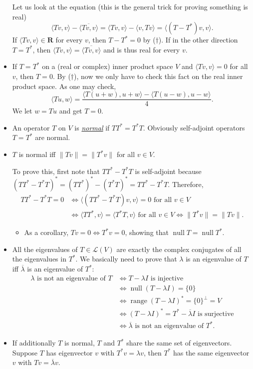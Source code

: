 \documentclass{article}
\newcommand{\df}[1]{\ul{\textit{#1}}}
\newcommand{\R}{\mathbf{R}}
\newcommand{\n}{\operatorname{null}}
\renewcommand{\r}{\operatorname{range}}
\newcommand{\conj}[1]{\overline{#1}}
\newcommand{\inp}[2]{\langle #1, #2 \rangle}
\newcommand{\nm}[1]{\| #1 \|}
\newcommand{\LV}{\mathcal{L}(V)}
\begin{document}
\begin{itemize}
    Let us look at the equation (this is the general trick for proving something is real)
    $$\inp{Tv}{v}-\conj{\inp{Tv}{v}}=\inp{Tv}{v}-\inp{v}{Tv}=\inp{(T-T^*)v}{v}.$$ If $\inp{Tv}{v} \in \R$ for every $v$, then $T-T^*=0$ by ($\dagger$). If in the other direction $T=T^*$, then $\inp{Tv}{v}=\conj{\inp{Tv}{v}}$ and is thus real for every $v$.
    \item If $T = T^*$ on a (real or complex) inner product space $V$ and $\inp{Tv}{v}=0$ for all $v$, then $T = 0$. By ($\dagger$), now we only have to check this fact on the real inner product space. As one may check, $$\inp{Tu}{w} = \frac{\inp{T(u+w)}{u+w}-\inp{T(u-w)}{u-w}}{4}.$$ We let $w = Tu$ and get $T = 0$.
    \item An operator $T$ on $V$ is \df{normal} if $TT^* = T^*T$. Obviously self-adjoint operators $T = T^*$ are normal.
    \item $T$ is normal iff $\nm{Tv}=\nm{T^*v}$ for all $v \in V$.
    
    To prove this, first note that $TT^* - T^*T$ is self-adjoint because $(TT^*-T^*T)^*=(TT^*)^*-(T^*T)^*=TT^* - T^*T$. Therefore,
    \begin{align*}
        TT^*-T^*T=0 & \iff \inp{(TT^*-T^*T)v}{v}=0 \text{ for all } v \in V \\ & \iff \inp{TT^*}{v} = \inp{T^*T}{v} \text{ for all } v \in V \iff \nm{T^*v}=\nm{Tv}.
    \end{align*}
    \begin{itemize}
        \item As a corollary, $Tv = 0 \iff T^*v = 0$, showing that $\n T = \n T^*$.
    \end{itemize}
    \item All the eigenvalues of $T \in \LV$ are exactly the complex conjugates of all the eigenvalues in $T^*$. We basically need to prove that $\lambda$ is an eigenvalue of $T$ iff $\conj{\lambda}$ is an eigenvalue of $T^*$:
    \begin{align*}
        \lambda \text{ is not an eigenvalue of } T & \iff T - \lambda I \text{ is injective} \\ & \iff \n (T-\lambda I) = \{0\} \\ & \iff \r (T-\lambda I)^* = \{0\}^\perp = V \\ & \iff (T-\lambda I)^* = T^* - \conj{\lambda} I \text{ is surjective} \\ & \iff \conj{\lambda} \text{ is not an eigenvalue of $T^*$}.
    \end{align*}
    \item If additionally $T$ is normal, $T$ and $T^*$ share the same set of eigenvectors. Suppose $T$ has eigenvector $v$ with $T^*v = \lambda v$, then $T^*$ has the same eigenvector $v$ with $Tv = \conj{\lambda}v$.
    

\end{itemize}
\end{document}
